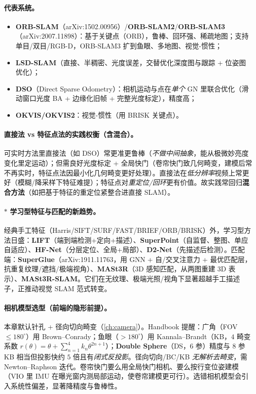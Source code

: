 \paragraph{代表系统\cite{carlone2026handbook}。}
\begin{itemize}
  \item \textbf{ORB-SLAM}（arXiv:1502.00956）/\textbf{ORB-SLAM2}/\textbf{ORB-SLAM3}（arXiv:2007.11898）：基于关键点（ORB），鲁棒、回环强、稀疏地图；支持单目/双目/RGB-D，ORB-SLAM3 扩到鱼眼、多地图、视觉-惯性；
  \item \textbf{LSD-SLAM}（直接、半稠密、光度误差，交替优化深度图与跟踪 + 位姿图优化）；
  \item \textbf{DSO}（Direct Sparse Odometry）：相机运动与点在\emph{单个} GN 里联合优化（滑动窗口光度 BA + 边缘化旧帧 + 完整光度标定），精度高；
  \item \textbf{OKVIS/OKVIS2}：视觉-惯性（用 BRISK 关键点）。
\end{itemize}

\paragraph{直接法 vs 特征点法的实践权衡（含混合）\cite{carlone2026handbook}。}可实时方法里直接法（如 DSO）常更准更鲁棒（\emph{不做中间抽象}，能从极微妙亮度变化里定运动）；但需良好光度标定 + 全局快门（卷帘快门致几何畸变，建模后常不再实时，特征点法因最小化几何畸变更好处理）。直接法在\emph{低分辨率}视频上常更好（模糊/降采样下特征难提）；特征点对\emph{重定位/回环}更有价值。故实践常回归\textbf{混合方法}（如把基于特征的重定位紧整合进直接 SLAM）。

\paragraph{$*$ 学习型特征与匹配的新趋势\cite{carlone2026handbook}。}经典手工特征（Harris/SIFT/SURF/FAST/BRIEF/ORB/BRISK）外，学习型方法日盛：\textbf{LIFT}（端到端检测+定向+描述）、\textbf{SuperPoint}（自监督、整图、单应自适应）、\textbf{HF-Net}（分层定位、全局+局部）、\textbf{D2-Net}（先描述后检测）。匹配端：\textbf{SuperGlue}（arXiv:1911.11763，用 GNN + 自/交叉注意力 + 最优匹配层，抗重复纹理/遮挡/极端视角）、\textbf{MASt3R}（3D 感知匹配，从两图重建 3D 表示）、\textbf{MASt3R-SLAM}。它们在无纹理、极端光照/视角下显著超越手工描述子，正推动视觉 SLAM 范式转变。

\paragraph{相机模型选型（前端的隐形前提）\cite{carlone2026handbook}。}本章默认针孔 + 径向切向畸变（\cref{ch:camera}）。Handbook 提醒：广角（FOV $\le180^\circ$）用 Brown--Conrady；鱼眼（$>180^\circ$）用 Kannala--Brandt（KB，$4$ 畸变系数 $r(\theta)=\theta+\sum_{n=1}^4 k_n\theta^{2n+1}$）；\textbf{Double Sphere}（DS，$6$ 参）精度与 $8$ 参 KB 相当但投影快约 $5$ 倍且有\emph{闭式反投影}。径向切向/BC/KB \emph{无解析去畸变}，需 Newton--Raphson 迭代。卷帘快门要么用全局快门相机、要么按行变位姿建模（VIO 里 IMU 在曝光窗内测局部运动，使卷帘建模更可行）。选错相机模型会引入系统性偏差，显著降精度与鲁棒性。

